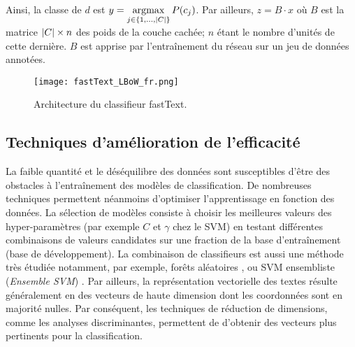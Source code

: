  Ainsi, la classe de $d$ est $y = \mathop{\mathrm{argmax}}\limits_{j \in \lbrace 1,...,{\vert C\vert} \rbrace} P(c_j)$. Par ailleurs, $z = B \cdot x$ où $B$ est la matrice ${\vert C\vert} \times n$ des poids de la couche cachée; $n$ étant le nombre d'unités de cette dernière. $B$ est apprise par l'entraînement du réseau sur un jeu de données annotées.
 
 \begin{figure}[!htb]
 	\centering
 	\texttt{[image: fastText\_LBoW\_fr.png]}
 	\caption{Architecture du classifieur fastText.}\label{fig:sensresultat:fastText}
 \end{figure}


\subsection{Techniques d'amélioration de l'efficacité}
La faible quantité \citep{ruparel2013smalldataclass} et le déséquilibre des données sont susceptibles d'être des obstacles à l'entraînement des modèles de classification. De nombreuses techniques permettent néanmoins d'optimiser l'apprentissage en fonction des données. La sélection de modèles consiste à choisir les meilleures valeurs des hyper-paramètres (par exemple $C$ et $\gamma$ chez le SVM) en testant différentes combinaisons de valeurs candidates sur une fraction de la base d'entraînement (base de développement). La combinaison de classifieurs est aussi une méthode très étudiée \citep{kittler1996combiningclassifiers,kuncheva2004combiningclassifiers, tulyakov2008combiningclassifiers} notamment, par exemple, forêts aléatoires \citep{breiman2001randomforest}, ou SVM ensembliste (\textit{Ensemble SVM}) \citep{dong2005ensembleSVM}.
Par ailleurs, la représentation vectorielle des textes résulte généralement en des vecteurs de haute dimension dont les coordonnées sont en majorité nulles. Par conséquent, les techniques de réduction de dimensions, comme les analyses discriminantes, permettent de d'obtenir des vecteurs plus pertinents pour la classification.

